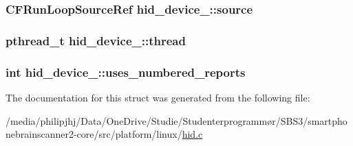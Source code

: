 \hypertarget{structhid__device___a3133e1c1a6481521f627e01e131614cb}{
\subsubsection[{source}]{\setlength{\rightskip}{0pt plus 5cm}C\-F\-Run\-Loop\-Source\-Ref hid\-\_\-device\-\_\-\-::source}}\label{structhid__device___a3133e1c1a6481521f627e01e131614cb}
\hypertarget{structhid__device___aeeb2baed80ebbceec2bdd31353917df2}{
\subsubsection[{thread}]{\setlength{\rightskip}{0pt plus 5cm}pthread\-\_\-t hid\-\_\-device\-\_\-\-::thread}}\label{structhid__device___aeeb2baed80ebbceec2bdd31353917df2}
\hypertarget{structhid__device___a58ed6252074ed422235fe9e0c48aeafe}{
\subsubsection[{uses\-\_\-numbered\-\_\-reports}]{\setlength{\rightskip}{0pt plus 5cm}int hid\-\_\-device\-\_\-\-::uses\-\_\-numbered\-\_\-reports}}\label{structhid__device___a58ed6252074ed422235fe9e0c48aeafe}


The documentation for this struct was generated from the following file\-:\begin{DoxyCompactItemize}
\item 
/media/philipjhj/\-Data/\-One\-Drive/\-Studie/\-Studenterprogrammør/\-S\-B\-S3/smartphonebrainscanner2-\/core/src/platform/linux/\hyperlink{linux_2hid_8c}{hid.\-c}\end{DoxyCompactItemize}

